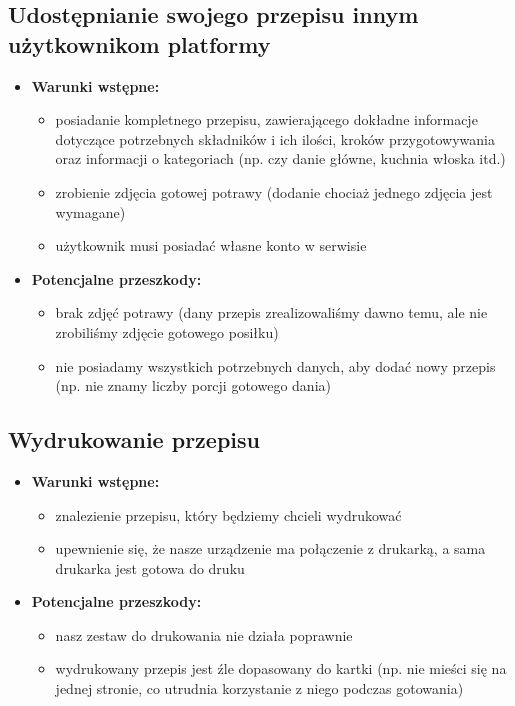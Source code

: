 \documentclass{article}
\begin{document}
\subsection{Udostępnianie swojego przepisu innym użytkownikom platformy}
  \begin{itemize}
    \item \textbf{Warunki wstępne:}
      \begin{itemize}
        \item posiadanie kompletnego przepisu, zawierającego dokładne informacje dotyczące potrzebnych składników i ich ilości, kroków przygotowywania oraz informacji o kategoriach (np. czy danie główne, kuchnia włoska itd.)
        \item zrobienie zdjęcia gotowej potrawy (dodanie chociaż jednego zdjęcia jest wymagane)
        \item użytkownik musi posiadać własne konto w serwisie
      \end{itemize}
    \item \textbf{Potencjalne przeszkody:}
      \begin{itemize}
        \item brak zdjęć potrawy (dany przepis zrealizowaliśmy dawno temu, ale nie zrobiliśmy zdjęcie gotowego posiłku)
        \item nie posiadamy wszystkich potrzebnych danych, aby dodać nowy przepis (np. nie znamy liczby porcji gotowego dania)
      \end{itemize}
  \end{itemize}
\subsection{Wydrukowanie przepisu}
  \begin{itemize}
    \item \textbf{Warunki wstępne:}
      \begin{itemize}
        \item znalezienie przepisu, który będziemy chcieli wydrukować
        \item upewnienie się, że nasze urządzenie ma połączenie z drukarką, a sama drukarka jest gotowa do druku
      \end{itemize}
    \item \textbf{Potencjalne przeszkody:}
      \begin{itemize}
        \item nasz zestaw do drukowania nie działa poprawnie
        \item wydrukowany przepis jest źle dopasowany do kartki (np. nie mieści się na jednej stronie, co utrudnia korzystanie z niego podczas gotowania)
      \end{itemize}
  \end{itemize}
\end{document}
